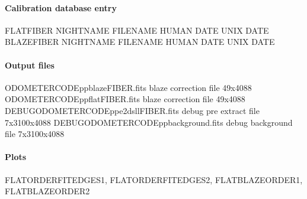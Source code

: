 \documentclass[a4paper,10pt,english]{report}
\begin{document}
\paragraph{Calibration database entry}
\label{\detokenize{user/spirou/recipes/flat_blaze:calibration-database-entry}}
\begin{sphinxVerbatim}[commandchars=\\\{\}]
FLAT\PYGZus{}FIBER NIGHT\PYGZus{}NAME FILENAME HUMAN DATE UNIX DATE
BLAZE\PYGZus{}FIBER NIGHT\PYGZus{}NAME FILENAME HUMAN DATE UNIX DATE
\end{sphinxVerbatim}


\paragraph{Output files}
\label{\detokenize{user/spirou/recipes/flat_blaze:output-files}}
\begin{sphinxVerbatim}[commandchars=\\\{\}]
ODOMETER\PYGZus{}CODE\PYGZus{}pp\PYGZus{}blaze\PYGZus{}FIBER.fits           blaze correction file 49x4088
ODOMETER\PYGZus{}CODE\PYGZus{}pp\PYGZus{}flat\PYGZus{}FIBER.fits            blaze correction file 49x4088
DEBUG\PYGZus{}ODOMETER\PYGZus{}CODE\PYGZus{}pp\PYGZus{}e2dsll\PYGZus{}FIBER.fits    debug pre extract file 7x3100x4088
DEBUG\PYGZus{}ODOMETER\PYGZus{}CODE\PYGZus{}pp\PYGZus{}background.fits        debug background file 7x3100x4088
\end{sphinxVerbatim}


\paragraph{Plots}
\label{\detokenize{user/spirou/recipes/flat_blaze:plots}}
\begin{sphinxVerbatim}[commandchars=\\\{\}]
FLAT\PYGZus{}ORDER\PYGZus{}FIT\PYGZus{}EDGES1, FLAT\PYGZus{}ORDER\PYGZus{}FIT\PYGZus{}EDGES2, FLAT\PYGZus{}BLAZE\PYGZus{}ORDER1,
FLAT\PYGZus{}BLAZE\PYGZus{}ORDER2
\end{sphinxVerbatim}
\end{document}
